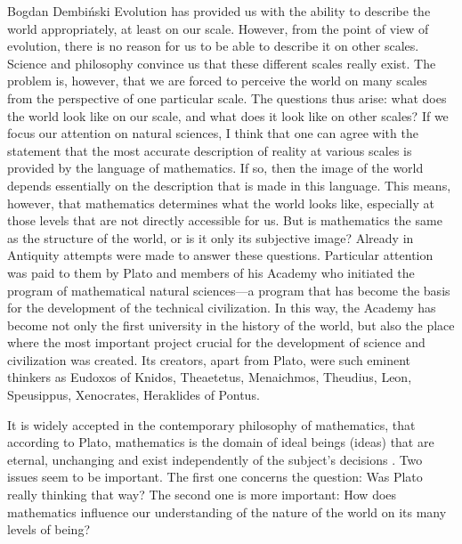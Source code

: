 \begin{artengenv}{Bogdan Dembiński}
\lettrine[loversize=0.13,lines=2,lraise=-0.05,nindent=0em,findent=0.2pt]%
{E}{}volution has provided us with the ability to describe the world appropriately, at least on%
 our scale. However, from the point of view of evolution, there is no reason for us to be able to describe it on other
scales. Science and philosophy convince us that these different scales really exist. The problem is, however, that we
are forced to perceive the world on many scales from the perspective of one particular scale. The questions thus arise:
what does the world look like  on our scale, and what does it look like on other scales? If we focus our attention on
natural sciences, I think that one can agree with the statement that the most accurate description of reality at
various scales is provided by the language of mathematics. If so, then the image of the world depends essentially on
the description that is made in this language. This means, however, that mathematics determines what the world looks
like, especially at those levels that are not directly accessible for us. But is mathematics the same as the structure
of the world, or is it only its subjective image? Already in Antiquity attempts were made to answer
these questions. Particular attention was paid to them by Plato and members of his Academy who initiated the program of
mathematical natural sciences---a program that has become the basis for the development of the technical civilization.
In this way, the Academy has become not only the first university in the history of the world, but also the place where
the most important project crucial for the development of science and civilization was created. Its creators, apart from
Plato, were such eminent thinkers as Eudoxos of Knidos, Theaetetus, Menaichmos, Theudius,%
Leon, Speusippus, Xenocrates, Heraklides of Pontus. 

It is widely accepted in the contemporary philosophy of mathematics, that according to Plato, mathematics is the domain
of ideal beings (ideas) that are eternal, unchanging and exist independently of the subject's decisions
\parencite[pp.12–16]{brown_philosophy_2008}.
Two issues seem to be important. The first
one concerns the question: Was Plato really thinking that way? The second one is more important: How does mathematics
influence our understanding of the nature of the world on its many levels of being?


\end{artengenv}
